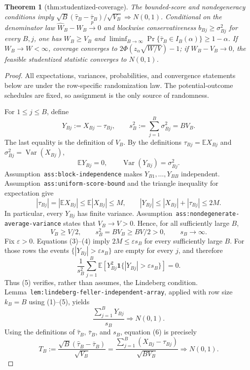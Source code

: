 \documentclass{article}
\newtheorem{theorem}{Theorem}
\begin{document}
\begin{theorem}[thm:studentized-coverage]\label{thm:studentized-coverage}
The bounded-score and nondegeneracy conditions imply \(\sqrt B(\widehat\tau_B-\bar\tau_B)/\sqrt{V_B}\Rightarrow N(0,1)\). Conditional on the denominator law \(\widehat W_B-W_B\xrightarrow{p}0\) and blockwise conservativeness \(b_{Bj}\ge\sigma_{Bj}^2\) for every \(B,j\), one has \(W_B\ge V_B\) and \(\liminf_{B\to\infty}\Pr\{\bar\tau_B\in I_B(\alpha)\}\ge1-\alpha\). If \(W_B\to W<\infty\), coverage converges to \(2\Phi(z_\alpha\sqrt{W/V})-1\); if \(W_B-V_B\to0\), the feasible studentized statistic converges to \(N(0,1)\).
\end{theorem}
\begin{proof}
All expectations, variances, probabilities, and convergence statements below are under the row-specific randomization law. The potential-outcome schedules are fixed, so assignment is the only source of randomness.

For \(1\le j\le B\), define
\[
Y_{Bj}:=X_{Bj}-\tau_{Bj},
\qquad
s_B^2:=\sum_{j=1}^B\sigma_{Bj}^2=B V_B.
\tag{1}
\]
The last equality is the definition of \(V_B\). By the definitions \(\tau_{Bj}=\mathbb E X_{Bj}\) and \(\sigma_{Bj}^2=\operatorname{Var}(X_{Bj})\),
\[
\mathbb E Y_{Bj}=0,
\qquad
\operatorname{Var}(Y_{Bj})=\sigma_{Bj}^2.
\tag{2}
\]
Assumption~\texttt{ass:block-independence} makes \(Y_{B1},\ldots,Y_{BB}\) independent. Assumption~\texttt{ass:uniform-score-bound} and the triangle inequality for expectation give
\[
|\tau_{Bj}|=|\mathbb E X_{Bj}|
\le \mathbb E|X_{Bj}|\le M,
\qquad
|Y_{Bj}|\le |X_{Bj}|+|\tau_{Bj}|\le2M.
\tag{3}
\]
In particular, every \(Y_{Bj}\) has finite variance. Assumption~\texttt{ass:nondegenerate-average-variance} states that \(V_B\to V>0\). Hence, for all sufficiently large \(B\),
\[
V_B\ge V/2,
\qquad
s_B^2=B V_B\ge BV/2>0,
\qquad
s_B\longrightarrow\infty.
\tag{4}
\]
Fix \(\varepsilon>0\). Equations (3)--(4) imply \(2M\le\varepsilon s_B\) for every sufficiently large \(B\). For those rows the events \(\{|Y_{Bj}|>\varepsilon s_B\}\) are empty for every \(j\), and therefore
\[
\frac1{s_B^2}\sum_{j=1}^B
\mathbb E\!\left[Y_{Bj}^2
\mathbf 1\{|Y_{Bj}|>\varepsilon s_B\}\right]=0.
\tag{5}
\]
Thus (5) verifies, rather than assumes, the Lindeberg condition. Lemma~\texttt{lem:lindeberg-feller-independent-array}, applied with row size \(k_B=B\) using (1)--(5), yields
\[
\frac{\sum_{j=1}^B Y_{Bj}}{s_B}\Rightarrow N(0,1).
\tag{6}
\]
Using the definitions of \(\widehat\tau_B\), \(\bar\tau_B\), and \(s_B\), equation (6) is precisely
\[
T_B:=\frac{\sqrt B(\widehat\tau_B-\bar\tau_B)}{\sqrt{V_B}}
=\frac{\sum_{j=1}^B(X_{Bj}-\tau_{Bj})}{\sqrt{B V_B}}
\Rightarrow N(0,1).
\tag{7}
\]


\end{proof}
\end{document}
